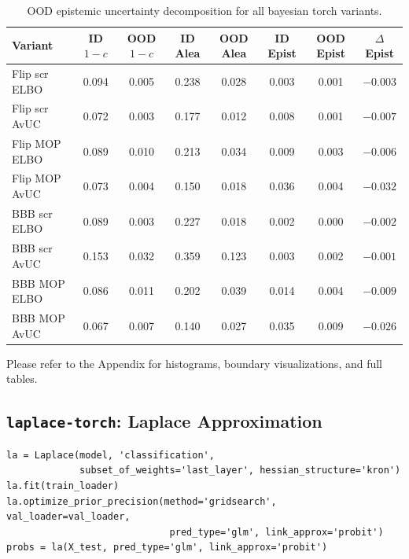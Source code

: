 \documentclass[conference]{IEEEtran}
\begin{document}
\begin{table}[H]
	\centering
	\caption{OOD epistemic uncertainty decomposition for all bayesian torch variants.}
	\label{tab:ood}
	\small\setlength{\tabcolsep}{4pt}
	\begin{tabular}{lccccccc}
		\toprule
		Variant       & ID $1 - c$ & OOD $1 - c$ & ID Alea & OOD Alea & ID Epist & OOD Epist & $\Delta$Epist \\
		\midrule
		Flip scr ELBO & 0.094      & 0.005       & 0.238   & 0.028    & 0.003    & 0.001     & $-0.003$      \\
		Flip scr AvUC & 0.072      & 0.003       & 0.177   & 0.012    & 0.008    & 0.001     & $-0.007$      \\
		Flip MOP ELBO & 0.089      & 0.010       & 0.213   & 0.034    & 0.009    & 0.003     & $-0.006$      \\
		Flip MOP AvUC & 0.073      & 0.004       & 0.150   & 0.018    & 0.036    & 0.004     & $-0.032$      \\
		BBB scr ELBO  & 0.089      & 0.003       & 0.227   & 0.018    & 0.002    & 0.000     & $-0.002$      \\
		BBB scr AvUC  & 0.153      & 0.032       & 0.359   & 0.123    & 0.003    & 0.002     & $-0.001$      \\
		BBB MOP ELBO  & 0.086      & 0.011       & 0.202   & 0.039    & 0.014    & 0.004     & $-0.009$      \\
		BBB MOP AvUC  & 0.067      & 0.007       & 0.140   & 0.027    & 0.035    & 0.009     & $-0.026$      \\
		\bottomrule
	\end{tabular}
\end{table}

Please refer to the Appendix for histograms, boundary visualizations, and full tables.

\subsection{\texttt{laplace-torch}: Laplace Approximation}
\label{sec:la}

\begin{lstlisting}[caption={Laplace post hoc workflow.}]
la = Laplace(model, 'classification',
             subset_of_weights='last_layer', hessian_structure='kron')
la.fit(train_loader)
la.optimize_prior_precision(method='gridsearch', val_loader=val_loader,
                             pred_type='glm', link_approx='probit')
probs = la(X_test, pred_type='glm', link_approx='probit')
\end{lstlisting}
\end{document}
